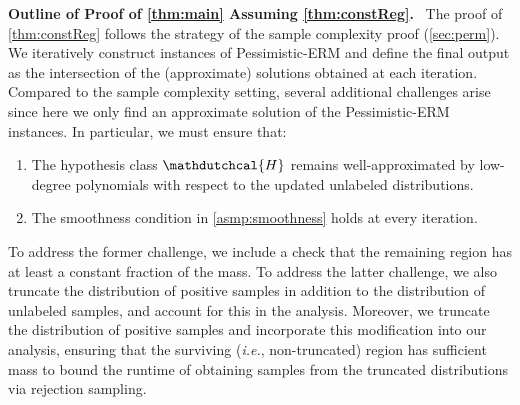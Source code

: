 \documentclass[11pt]{article}
\theoremstyle{plain}
\theoremstyle{definition}
\theoremstyle{remark}
\renewcommand{\paragraph}[1]{\medskip \noindent\textbf{#1}~}
\newcommand{\ie}{\textit{i.e.}}
\newcommand{\hypo}[1]{\mathdutchcal{#1}}
\newcommand{\hyH}{\hypo{H}}
\newcommand{\pERM}{Pessimistic-ERM}
\begin{document}
        \paragraph{Outline of Proof of \cref{thm:main} Assuming \cref{thm:constReg}.}
        The proof of \cref{thm:constReg} follows the strategy of the sample complexity proof (\cref{sec:perm}). 
        We iteratively construct instances of \pERM{} and define the final output as the intersection of the (approximate) solutions obtained at each iteration. 
        Compared to the sample complexity setting, several additional challenges arise since here we only find an approximate solution of the \pERM{} instances. 
        In particular, we must ensure that:
        \begin{enumerate}
            \item The hypothesis class $\hyH$ remains well-approximated by low-degree polynomials with respect to the updated unlabeled distributions.
            \item The smoothness condition in \cref{asmp:smoothness} holds at every iteration.
        \end{enumerate}
        To address the former challenge, we include a check that the remaining region has at least a constant fraction of the mass. 
        To address the latter challenge, we also truncate the distribution of positive samples in addition to the distribution of unlabeled samples, and account for this in the analysis.
        Moreover, we truncate the distribution of positive samples and incorporate this modification into our analysis, ensuring that the surviving (\ie{}, non-truncated) region has sufficient mass to bound the runtime of obtaining samples from the truncated distributions via rejection sampling.
 
\end{document}
